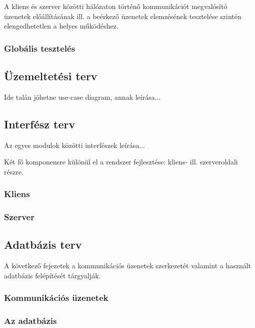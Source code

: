 A kliens és szerver közötti hálózaton történő kommunikációt megvalósító üzenetek előállításának ill. a beérkező üzenetek elemzésének tesztelése szintén elengedhetetlen a helyes működéshez.

\subsubsection{Globális tesztelés}

\subsection{Üzemeltetési terv}
\label{sec:uzemeltetesi_terv}

Ide talán jöhetne use-case diagram, annak leírása...

\subsection{Interfész terv}
\label{sec:interfesz_terv}

Az egyes modulok közötti interfészek leírása...

Két fő komponensre különül el a rendszer fejlesztése: kliens-
ill. szerveroldali részre.

\subsubsection{Kliens}
\label{sec:kliensinterfesz}

\subsubsection{Szerver}
\label{sec:szerverinterfesz}

\subsection{Adatbázis terv}

A következő fejezetek a kommunikációs üzenetek szerkezetét valamint a használt adatbázis felépítését tárgyalják.


\subsubsection{Kommunikációs üzenetek}
\label{sec:kommuzenetek}

\subsubsection{Az adatbázis}
\label{sec:adatb}

